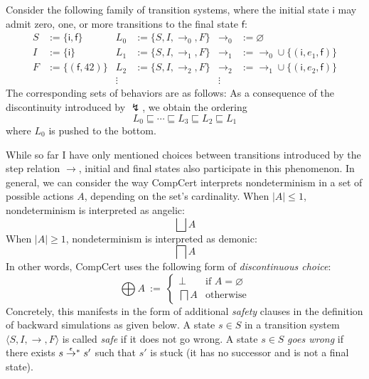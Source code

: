 \documentclass[sigplan,10pt,review,anonymous]{acmart}
\newcommand{\kw}[1]{\ensuremath{\mathsf{#1}}}
\newcommand{\refby}{\sqsubseteq}
\begin{document}
\begin{example} %
Consider the following family of transition systems,
where the initial state $\kw{i}$ may admit zero, one, or more
transitions to the final state $\kw{f}$:
\begin{align*}
  S &:= \{ \kw{i}, \kw{f} \} &
  L_0 &:= \{ S, I, {\rightarrow_0}, F \} &
  {\rightarrow_0} &:= \varnothing \\
  I &:= \{ \kw{i} \} &
  L_1 &:= \{ S, I, {\rightarrow_1}, F \} &
  {\rightarrow_1} &:= {\rightarrow_0} \cup
    \{ (\kw{i}, e_1, \kw{f}) \} \\
  F &:= \{ (\kw{f}, 42) \} &
  L_2 &:= \{ S, I, {\rightarrow_2}, F \} &
  {\rightarrow_2} &:= {\rightarrow_1} \cup
    \{ (\kw{i}, e_2, \kw{f}) \} \\
  & & \vdots \: & & \vdots \:\:
\end{align*}
The corresponding sets of behaviors are as follows:
As a consequence of the discontinuity introduced by $\lightning$,
we obtain the ordering
\[
  L_0 \refby \cdots \refby L_3 \refby L_2 \refby L_1
\]
where $L_0$ is pushed to the bottom.
\end{example}

While so far I have only mentioned
choices between transitions
introduced by the step relation $\rightarrow$,
initial and final states also participate in this phenomenon.
In general,
we can consider the way CompCert interprets nondeterminism
in a set of possible actions $A$,
depending on the set's cardinality.
When $|A| \le 1$, nondeterminism is interpreted as angelic:
\[
  \bigsqcup A
\]
When $|A| \ge 1$, nondeterminism is interpreted as demonic:
\[
  \bigsqcap A
\]
In other words, CompCert uses the following form of
\emph{discontinuous choice}:
\[
  \bigoplus A \: := \:
  \begin{cases}
    \bot & \mbox{if } A = \varnothing \\
    \bigsqcap A & \mbox{otherwise}
  \end{cases}
\]
Concretely, this manifests in the form of additional
\emph{safety} clauses
in the definition of backward simulations
as given below.
A state $s \in S$
in a transition system $\langle S, I, {\rightarrow}, F \rangle$
is called \emph{safe}
if it does not go wrong.
A state $s \in S$
\emph{goes wrong} if there exists
$s \mathrel{\smash{\stackrel{\epsilon}{\rightarrow}}^*} s'$
such that $s'$ is stuck
(it has no successor and is not a final state).
\end{document}
